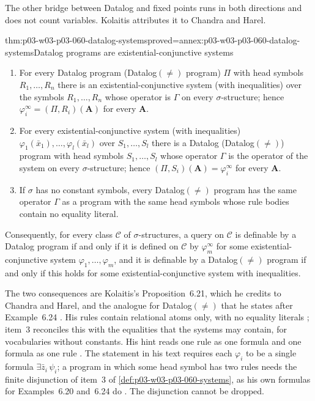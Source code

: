 The other bridge between Datalog and fixed points runs in both directions
and does not count variables. Kolaitis attributes it to Chandra and Harel.

\begin{hbtheorem}{thm:p03-w03-p03-060-datalog-systems}{proved=annex:p03-w03-p03-060-datalog-systems}{Datalog programs are existential-conjunctive systems}
\begin{enumerate}
\item For every Datalog program (Datalog\((\neq)\) program) \(\Pi\) with
      head symbols \(R_1,\ldots,R_n\) there is an existential-conjunctive
      system (with inequalities) over the symbols \(R_1,\ldots,R_n\) whose
      operator is \(\Gamma\) on every \(\sigma\)-structure; hence
      \(\varphi_i^\infty=(\Pi,R_i)(\mathbf A)\) for every \(\mathbf A\).
\item For every existential-conjunctive system (with inequalities)
      \(\varphi_1(\bar x_1),\ldots,\varphi_l(\bar x_l)\) over
      \(S_1,\ldots,S_l\) there is a Datalog (Datalog\((\neq)\)) program with
      head symbols \(S_1,\ldots,S_l\) whose operator \(\Gamma\) is the
      operator of the system on every \(\sigma\)-structure; hence
      \((\Pi,S_i)(\mathbf A)=\varphi_i^\infty\) for every \(\mathbf A\).
\item If \(\sigma\) has no constant symbols, every Datalog\((\neq)\)
      program has the same operator \(\Gamma\) as a program with the same
      head symbols whose rule bodies contain no equality literal.
\end{enumerate}
Consequently, for every class \(\mathcal C\) of \(\sigma\)-structures, a
query on \(\mathcal C\) is definable by a Datalog program if and only if it
is defined on \(\mathcal C\) by \(\varphi_m^\infty\) for some
existential-conjunctive system \(\varphi_1,\ldots,\varphi_m\), and it is
definable by a Datalog\((\neq)\) program if and only if this holds for some
existential-conjunctive system with inequalities.
\end{hbtheorem}

The two consequences are Kolaitis's Proposition~6.21, which he credits to
Chandra and Harel, and the analogue for Datalog\((\neq)\) that he states
after Example~6.24 \cite[pp.~43 and~45]{Kolaitis2003ExpressivePowerNotes}.
His rules contain relational atoms only, with no equality literals
\cite[p.~42]{Kolaitis2003ExpressivePowerNotes}; item~3 reconciles this
with the equalities that the systems may contain, for vocabularies without
constants. His hint reads one rule as one formula and one formula as one
rule \cite[p.~44]{Kolaitis2003ExpressivePowerNotes}. The statement in
his text requires each \(\varphi_i\) to be a single formula
\(\exists\bar z_i\,\psi_i\); a program in which some head symbol has two
rules needs the finite disjunction of item~3 of
\cref{def:p03-w03-p03-060-systems}, as his own formulas for Examples~6.20
and~6.24 do \cite[pp.~43 and~45]{Kolaitis2003ExpressivePowerNotes}.
The disjunction cannot be dropped.

